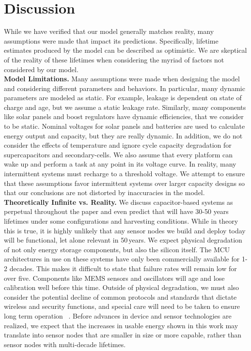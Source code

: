 \section{Discussion}
\label{sec:disc}
While we have verified that our model generally matches reality, many
assumptions were made that impact its predictions. Specifically,
lifetime estimates produced by the model can be described as optimistic. We are
skeptical of the reality of these lifetimes when considering the myriad of
factors not considered by our model.\\

\vspace{-6pt}
\noindent
\textbf{Model Limitations.}
Many assumptions were made when designing the model and considering different
parameters and behaviors.  In particular, many dynamic parameters are modeled
as static. For example, leakage is dependent on state of charge and age,
but we assume a static leakage rate. Similarly, many
components like solar panels and boost regulators have dynamic efficiencies,
that we consider to be static. Nominal voltages for solar panels and
batteries are used
to calculate energy output and capacity,
but they
are really dynamic. In addition, we do not consider the effects of temperature
and ignore cycle capacity degradation for supercapacitors and
secondary-cells. We also assume that every platform can wake up
and perform a task at any point in its voltage curve. In reality,
many intermittent systems must recharge to a threshold voltage. We attempt
to ensure that these assumptions favor intermittent systems over
larger capacity designs so that
our conclusions are not distorted by inaccuracies in the model.\\

\vspace{-6pt}
\noindent
\textbf{Theoretically Infinite vs. Reality.}
We discuss capacitor-based systems as perpetual throughout the
paper and even predict that \name will have 30-50 years lifetimes
under some configurations and harvesting conditions. While in theory
this is true, it is highly unlikely that any sensor nodes we build and deploy today
will be functional, let alone relevant in 50\,years.
We expect physical degradation of not only energy storage components, but
also the silicon itself. The MCU architectures in use on these systems have
only been commercially available for 1-2 decades. This makes it
difficult to state that failure rates will remain low for over five.
Components like MEMS sensors and oscillators
will age and lose calibration well before this time.
Outside of physical degradation, we must also consider the potential decline of common
protocols and standards that dictate wireless and security functions, and special
care will need to be taken to ensure long term operation ~\cite{kininghamCESEL16}.
Before advances in device and sensor technologies are realized,
we expect that the increases in usable energy shown in this work may translate into
sensor nodes that are smaller in size or more capable,
rather than sensor nodes with multi-decade lifetimes.


